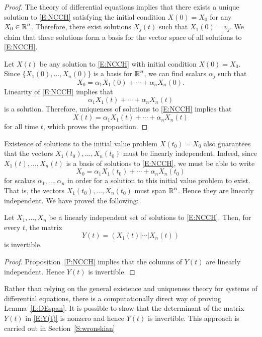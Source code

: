 \documentclass{ximera}
\begin{document}
\begin{proof} The theory of differential equations implies that there exists a 
unique solution to \eqref{E:NCCH}  satisfying the initial condition $X(0)=X_0$ 
for any $X_0\in\mbox{$\Bbb{R}$}^n$.   Therefore, there exist solutions $X_j(t)$ such that 
$X_1(0)=v_j$.  We claim that these solutions form a basis for the vector 
space of all solutions to \eqref{E:NCCH}.   

Let $X(t)$ be any solution to \eqref{E:NCCH} with initial condition $X(0)=X_0$. 
Since $\{X_1(0),\ldots,X_n(0)\}$ is a basis for $\mbox{$\Bbb{R}$}^n$, we can find scalars 
$\alpha_j$ such that 
\[
X_0 = \alpha_1X_1(0) + \cdots + \alpha_nX_n(0).
\]
Linearity of \eqref{E:NCCH} implies that 
\[
\alpha_1X_1(t) + \cdots + \alpha_nX_n(t)
\]
is a solution.  Therefore, uniqueness of solutions to \eqref{E:NCCH} implies 
that 
\[
X(t) = \alpha_1X_1(t) + \cdots + \alpha_nX_n(t)
\]
for all time $t$, which proves the proposition. \end{proof}

Existence of solutions to the initial value problem $X(t_0)=X_0$ also
guarantees that the vectors $X_1(t_0),\ldots,X_n(t_0)$ must be linearly 
independent.  
Indeed, since $X_1(t),\ldots,X_n(t)$ is a 
basis of solutions to
\eqref{E:NCCH}, we must be able to write 
\[
X_0 = \alpha_1X_1(t_0) + \cdots + \alpha_nX_n(t_0)
\]
for scalars $\alpha_1,\ldots,\alpha_n$ in order for a solution to this 
initial value problem to exist.  That is, the vectors 
$X_1(t_0),\ldots,X_n(t_0)$  must span $\mbox{$\Bbb{R}$}^n$.   Hence they are linearly 
independent.  We have proved the following:

\begin{lemma}  \label{L:DEspan}
Let $X_1,\ldots,X_n$ be a linearly independent 
set of solutions to \eqref{E:NCCH}.
Then, for every $t$, the matrix 
\begin{equation}   \label{E:Y(t)}
Y(t) = \left(X_1(t)|\cdots |X_n(t)\right) 
\end{equation}
is invertible.
\end{lemma}

\begin{proof}  Proposition~\ref{P:NCCH} implies that the columns of $Y(t)$ are 
linearly independent.  Hence $Y(t)$ is invertible.  \end{proof}

Rather than relying on the general existence and uniqueness theory for
systems of differential equations, there is a computationally direct way of 
proving Lemma~\ref{L:DEspan}.   It is possible to show that the determinant 
of the matrix $Y(t)$ in \eqref{E:Y(t)} is nonzero and hence $Y(t)$ is invertible.
This approach is carried out in Section~\ref{S:wronskian}
\end{document}
